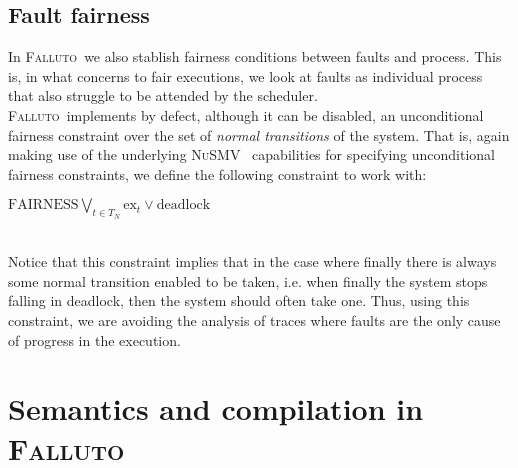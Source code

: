 \documentclass{llncs2e/llncs}
\newcommand{\nusmv}{\mbox{\textsc{NuSMV}}}
\newcommand{\falluto}{\nohyphens{\textsc{Falluto}}}
\newcommand{\fallutoSp}{\nohyphens{\textsc{Falluto~}}}  %
\newcommand{\centerthis}[1]{\vspace{0.2cm}\\\centerline{#1}\vspace{0.2cm}\\}
\begin{document}
\subsection{Fault fairness}\label{fault fairness}
In \fallutoSp we also stablish fairness conditions between faults and process. This is, in what
concerns to fair executions, we look at faults as individual process that also struggle to be attended by the scheduler.\\
\fallutoSp implements by defect, although it can be disabled, an unconditional fairness constraint over the set of \textit{normal transitions} of the system. That is, again making use of the underlying \nusmv~ capabilities for specifying unconditional fairness constraints, we define the following constraint to work with:
\centerthis{$\text{FAIRNESS} \bigvee_{t \in T_N} \text{ex}_t \vee \text{deadlock}$}
Notice that this constraint implies that in the case where finally there is always some normal transition enabled to be taken, i.e. when finally the system stops falling in deadlock, then the system should often take one. Thus, using this constraint, we are avoiding the analysis of traces where faults are the only cause of progress in the execution.

\section{Semantics and compilation in \falluto}\label{compilation}
\end{document}
